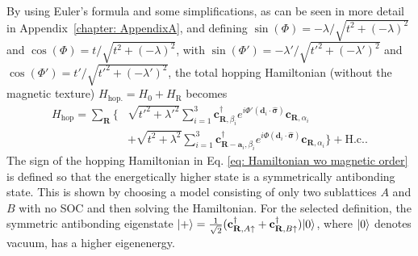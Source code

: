 By using Euler's formula and some simplifications, as can be seen in more detail in Appendix~\ref{chapter: AppendixA}, and defining $\sin(\Phi) = -\lambda/\sqrt{t^2+(-\lambda)^2}$ and $\cos(\Phi) = t/\sqrt{t^2 + (-\lambda)^2}$, with $\sin(\Phi') = -\lambda'/\sqrt{t'^2+(-\lambda')^2}$ and $\cos(\Phi') = t'/\sqrt{t'^2 + (-\lambda')^2}$, the total hopping Hamiltonian (without the magnetic texture) $H_\text{hop.} = H_0 + H_\text{R}$ becomes
\begin{align}
H_{\mathrm{hop}}
=
\sum_{\mathbf R}
\Bigg\{
&\sqrt{t'^2+\lambda'^2}
\sum_{i=1}^{3}
\mathbf{c}_{\mathbf R,\beta_i}^\dagger
e^{i\Phi'(\mathbf d_i\cdot\bm{\hat{\sigma}})}
\mathbf{c}_{\mathbf R,\alpha_i}
\nonumber\\
&+
\sqrt{t^2+\lambda^2}
\sum_{i=1}^{3}
\mathbf{c}_{\mathbf R-\mathbf a_i,\beta_i}^\dagger
e^{i\Phi(\mathbf d_i\cdot\bm{\hat{\sigma}})}
\mathbf{c}_{\mathbf R,\alpha_i}
\Bigg\}
+\mathrm{H.c.}.
\label{eq: Hamiltonian wo magnetic order}
\end{align}
The sign of the hopping Hamiltonian in Eq. \eqref{eq: Hamiltonian wo magnetic order} is defined so that the energetically higher state is a symmetrically antibonding state. This is shown by choosing a model consisting of only two sublattices $A$ and $B$ with no SOC and then solving the Hamiltonian. For the selected definition, the symmetric antibonding eigenstate $\lvert + \rangle = \frac{1}{\sqrt{2}}(\mathbf{c}_{\mathbf{R},A\uparrow}^\dagger + \mathbf{c}_{\mathbf{R},B\uparrow}^\dagger)\lvert 0 \rangle$, where $\lvert 0 \rangle$ denotes vacuum, has a higher eigenenergy. 
